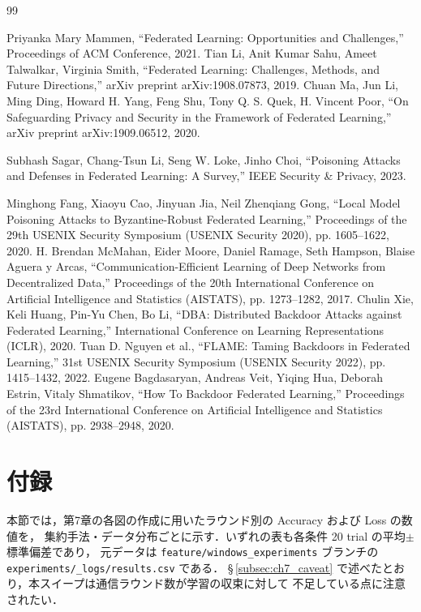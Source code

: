 \documentclass[a4j, twocolumn, dvipdfmx]{jsarticle}  %
\begin{document}
\begin{thebibliography}{99}

Priyanka Mary Mammen,
``Federated Learning: Opportunities and Challenges,''
Proceedings of ACM Conference,
2021.
Tian Li,
Anit Kumar Sahu,
Ameet Talwalkar,
Virginia Smith,
``Federated Learning: Challenges, Methods, and Future Directions,''
arXiv preprint arXiv:1908.07873,
2019.
Chuan Ma,
Jun Li,
Ming Ding,
Howard H. Yang,
Feng Shu,
Tony Q. S. Quek,
H. Vincent Poor,
``On Safeguarding Privacy and Security in the Framework of Federated Learning,''
arXiv preprint arXiv:1909.06512,
2020.

Subhash Sagar,
Chang-Tsun Li,
Seng W. Loke,
Jinho Choi,
``Poisoning Attacks and Defenses in Federated Learning: A Survey,''
IEEE Security \& Privacy,
2023.

Minghong Fang,
Xiaoyu Cao,
Jinyuan Jia,
Neil Zhenqiang Gong,
``Local Model Poisoning Attacks to Byzantine-Robust Federated Learning,''
Proceedings of the 29th USENIX Security Symposium (USENIX Security 2020),
pp. 1605--1622,
2020.
H. Brendan McMahan,
Eider Moore,
Daniel Ramage,
Seth Hampson,
Blaise Aguera y Arcas,
``Communication-Efficient Learning of Deep Networks from Decentralized Data,''
Proceedings of the 20th International Conference on Artificial Intelligence and Statistics (AISTATS),
pp. 1273--1282,
2017.
Chulin Xie,
Keli Huang,
Pin-Yu Chen,
Bo Li,
``DBA: Distributed Backdoor Attacks against Federated Learning,''
International Conference on Learning Representations (ICLR),
2020.
Tuan D. Nguyen et al.,
``FLAME: Taming Backdoors in Federated Learning,''
31st USENIX Security Symposium (USENIX Security 2022),
pp. 1415--1432,
2022.
Eugene Bagdasaryan,
Andreas Veit,
Yiqing Hua,
Deborah Estrin,
Vitaly Shmatikov,
``How To Backdoor Federated Learning,''
Proceedings of the 23rd International Conference on Artificial Intelligence and Statistics (AISTATS),
pp. 2938--2948,
2020.
\end{thebibliography}

\clearpage
\onecolumn

\section{付録}
本節では，第7章の各図の作成に用いたラウンド別の Accuracy および Loss の数値を，
集約手法・データ分布ごとに示す．いずれの表も各条件 20 trial の平均$\pm$標準偏差であり，
元データは \texttt{feature/windows\_experiments} ブランチの \texttt{experiments/\_logs/results.csv} である．
\S\,\ref{subsec:ch7_caveat} で述べたとおり，本スイープは通信ラウンド数が学習の収束に対して
不足している点に注意されたい．
\end{document}
